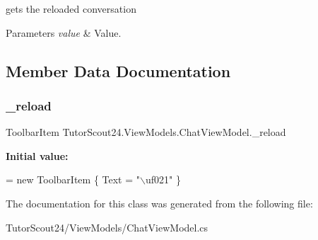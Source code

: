 gets the reloaded conversation 


\begin{DoxyParams}{Parameters}
{\em value} & Value.\\
\hline
\end{DoxyParams}


\subsection{Member Data Documentation}
\mbox{\label{class_tutor_scout24_1_1_view_models_1_1_chat_view_model_a436239b9dcfd275c018fe0accad173af}} 
\subsubsection{\texorpdfstring{\+\_\+reload}{\_reload}}
{\footnotesize\ttfamily Toolbar\+Item Tutor\+Scout24.\+View\+Models.\+Chat\+View\+Model.\+\_\+reload}

{\bfseries Initial value\+:}
\begin{DoxyCode}
= \textcolor{keyword}{new} ToolbarItem
        \{
            Text = \textcolor{stringliteral}{"\(\backslash\)uf021"}
        \}
\end{DoxyCode}


The documentation for this class was generated from the following file\+:\begin{DoxyCompactItemize}
\item 
Tutor\+Scout24/\+View\+Models/Chat\+View\+Model.\+cs\end{DoxyCompactItemize}
